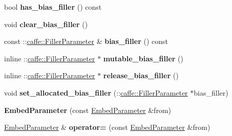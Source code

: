 \begin{DoxyCompactItemize}
\item 
\mbox{\label{classcaffe_1_1_embed_parameter_a355c03e05110c7969308a538e8960736}} 
bool {\bfseries has\+\_\+bias\+\_\+filler} () const
\item 
\mbox{\label{classcaffe_1_1_embed_parameter_a865d94863194d965d1f0913b00482b6d}} 
void {\bfseries clear\+\_\+bias\+\_\+filler} ()
\item 
\mbox{\label{classcaffe_1_1_embed_parameter_a662fe263497fe00dc8e840a71d761c82}} 
const \+::\mbox{\hyperlink{classcaffe_1_1_filler_parameter}{caffe\+::\+Filler\+Parameter}} \& {\bfseries bias\+\_\+filler} () const
\item 
\mbox{\label{classcaffe_1_1_embed_parameter_a076a1913c053293d718c2ddd303556b0}} 
inline \+::\mbox{\hyperlink{classcaffe_1_1_filler_parameter}{caffe\+::\+Filler\+Parameter}} $\ast$ {\bfseries mutable\+\_\+bias\+\_\+filler} ()
\item 
\mbox{\label{classcaffe_1_1_embed_parameter_a2b0cf3dc4f0544f865bda833bf432b08}} 
inline \+::\mbox{\hyperlink{classcaffe_1_1_filler_parameter}{caffe\+::\+Filler\+Parameter}} $\ast$ {\bfseries release\+\_\+bias\+\_\+filler} ()
\item 
\mbox{\label{classcaffe_1_1_embed_parameter_a1b8dd0b26c9aedb17762ab6ce0220082}} 
void {\bfseries set\+\_\+allocated\+\_\+bias\+\_\+filler} (\+::\mbox{\hyperlink{classcaffe_1_1_filler_parameter}{caffe\+::\+Filler\+Parameter}} $\ast$bias\+\_\+filler)
\item 
\mbox{\label{classcaffe_1_1_embed_parameter_ace9270c8d531a5e1ee56f86e158e2a45}} 
{\bfseries Embed\+Parameter} (const \mbox{\hyperlink{classcaffe_1_1_embed_parameter}{Embed\+Parameter}} \&from)
\item 
\mbox{\label{classcaffe_1_1_embed_parameter_ae298fa86c4904200ff2f000cd42e892d}} 
\mbox{\hyperlink{classcaffe_1_1_embed_parameter}{Embed\+Parameter}} \& {\bfseries operator=} (const \mbox{\hyperlink{classcaffe_1_1_embed_parameter}{Embed\+Parameter}} \&from)

\end{DoxyCompactItemize}
